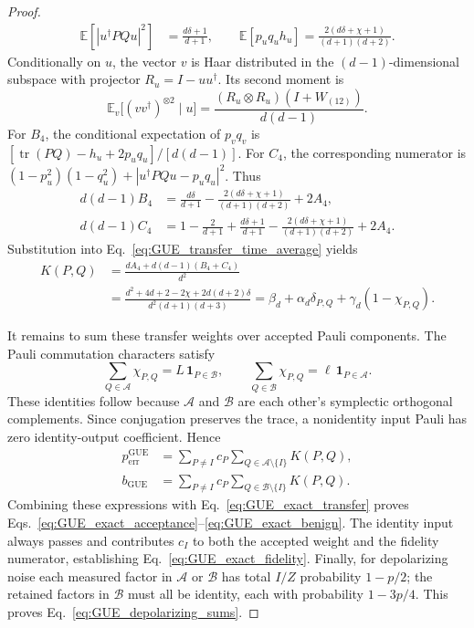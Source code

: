 \documentclass[onecolumn,prx,longbibliography,nofootinbib, superscriptaddress]{revtex4-2}
\theoremstyle{recap}
\begin{document}
\begin{proof}
\begin{align}
    \mathbb E[|u^\dagger PQu|^2]&=\frac{d\delta+1}{d+1},\qquad
    \mathbb E[p_uq_u h_u]=\frac{2(d\delta+\chi+1)}{(d+1)(d+2)}.
\end{align}
Conditionally on $u$, the vector $v$ is Haar distributed in the $(d-1)$-dimensional subspace with projector $R_u=I-uu^\dagger$. Its second moment is
\begin{equation}
    \mathbb E_v\bigl[(vv^\dagger)^{\otimes2}\mid u\bigr]
    =\frac{(R_u\otimes R_u)(I+W_{(12)})}{d(d-1)}.
\end{equation}
For $B_4$, the conditional expectation of $p_vq_v$ is
$[\operatorname{tr}(PQ)-h_u+2p_uq_u]/[d(d-1)]$.
For $C_4$, the corresponding numerator is
$(1-p_u^2)(1-q_u^2)+|u^\dagger PQu-p_uq_u|^2$.
Thus
\begin{align}
    d(d-1)B_4
    &=\frac{d\delta}{d+1}
      -\frac{2(d\delta+\chi+1)}{(d+1)(d+2)}+2A_4,\\
    d(d-1)C_4
    &=1-\frac{2}{d+1}+\frac{d\delta+1}{d+1}
      -\frac{2(d\delta+\chi+1)}{(d+1)(d+2)}+2A_4.
\end{align}
Substitution into Eq.~\eqref{eq:GUE_transfer_time_average} yields
\begin{align}
    K(P,Q)
    &=\frac{dA_4+d(d-1)(B_4+C_4)}{d^2}\\
    &=\frac{d^2+4d+2-2\chi+2d(d+2)\delta}{d^2(d+1)(d+3)}
      =\beta_d+\alpha_d\delta_{P,Q}+\gamma_d(1-\chi_{P,Q}).\label{eq:GUE_exact_transfer}
\end{align}

It remains to sum these transfer weights over accepted Pauli components. The Pauli commutation characters satisfy
\begin{equation}
    \sum_{Q\in\mathcal A}\chi_{P,Q}
       =L\,\mathbf 1_{P\in\mathcal B},\qquad
    \sum_{Q\in\mathcal B}\chi_{P,Q}
       =\ell\,\mathbf 1_{P\in\mathcal A}.
\end{equation}
These identities follow because $\mathcal A$ and $\mathcal B$ are each other's symplectic orthogonal complements. Since conjugation preserves the trace, a nonidentity input Pauli has zero identity-output coefficient. Hence
\begin{align}
    p_{\mathrm{err}}^{\mathrm{GUE}}
      &=\sum_{P\ne I}c_P\sum_{Q\in\mathcal A\setminus\{I\}}K(P,Q),\\
    b_{\mathrm{GUE}}
      &=\sum_{P\ne I}c_P\sum_{Q\in\mathcal B\setminus\{I\}}K(P,Q).
\end{align}
Combining these expressions with Eq.~\eqref{eq:GUE_exact_transfer} proves Eqs.~\eqref{eq:GUE_exact_acceptance}--\eqref{eq:GUE_exact_benign}. The identity input always passes and contributes $c_I$ to both the accepted weight and the fidelity numerator, establishing Eq.~\eqref{eq:GUE_exact_fidelity}. Finally, for depolarizing noise each measured factor in $\mathcal A$ or $\mathcal B$ has total $I/Z$ probability $1-p/2$; the retained factors in $\mathcal B$ must all be identity, each with probability $1-3p/4$. This proves Eq.~\eqref{eq:GUE_depolarizing_sums}.
\end{proof}
\end{document}
